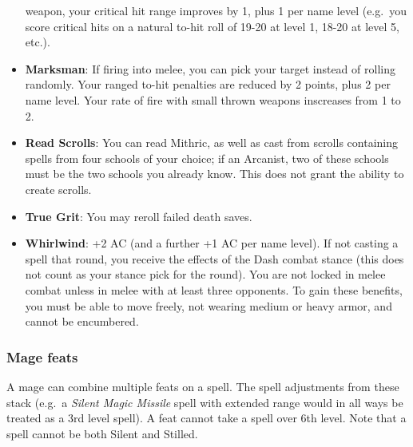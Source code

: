 \documentclass{article}
\begin{document}
\begin{multicols}{2}
\begin{itemize}
  weapon, your critical hit range improves by 1, plus 1 per name level
  (e.g.~you score critical hits on a natural to-hit roll of 19-20 at
  level 1, 18-20 at level 5, etc.).
\item
  \textbf{Marksman}: If firing into melee, you can pick your target
  instead of rolling randomly. Your ranged to-hit penalties are reduced
  by 2 points, plus 2 per name level. Your rate of fire with small
  thrown weapons inscreases from 1 to 2.
\item
  \textbf{Read Scrolls}: You can read Mithric, as well as cast from
  scrolls containing spells from four schools of your choice; if an
  Arcanist, two of these schools must be the two schools you already
  know. This does not grant the ability to create scrolls.
\item
  \textbf{True Grit}: You may reroll failed death saves.
\item
  \textbf{Whirlwind}: +2 AC (and a further +1 AC per name level). If not
  casting a spell that round, you receive the effects of the Dash combat
  stance (this does not count as your stance pick for the round). You
  are not locked in melee combat unless in melee with at least three
  opponents. To gain these benefits, you must be able to move freely,
  not wearing medium or heavy armor, and cannot be encumbered.
\end{itemize}

\subsubsection{Mage feats}\label{mage-feats}

A mage can combine multiple feats on a spell. The spell adjustments from
these stack (e.g.~a \emph{Silent Magic Missile} spell with extended
range would in all ways be treated as a 3rd level spell). A feat cannot
take a spell over 6th level. Note that a spell cannot be both Silent and
Stilled.


\end{multicols}
\end{document}
